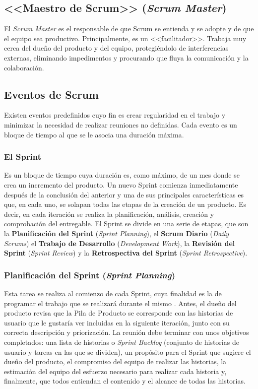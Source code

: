 \subsection*{<<Maestro de Scrum>> (\textit{Scrum Master})}
El \textit{Scrum Master} \cite{Gomez2017} es el responsable de que Scrum se entienda y se adopte y de que el equipo sea productivo. Principalmente, es un <<facilitador>>. Trabaja muy cerca del dueño del producto y del equipo, protegiéndolo de interferencias externas, eliminando impedimentos y procurando que fluya la comunicación y la colaboración.

\subsection{Eventos de Scrum}
Existen eventos \cite{Schwaber2017} predefinidos cuyo fin es crear regularidad en el trabajo y minimizar la necesidad de realizar reuniones no definidas. Cada evento es un bloque de tiempo al que se le asocia una duración máxima.

\newpage

\subsubsection{El Sprint}
Es un bloque de tiempo cuya duración es, como máximo, de un mes donde se crea un incremento del producto. Un nuevo Sprint comienza inmediatamente después de la conclusión del anterior y una de sus principales características es que, en cada uno, se solapan todas las etapas de la creación de un producto. Es decir, en cada iteración se realiza la planificación, análisis, creación y comprobación del entregable. El Sprint se divide en una serie de etapas, que son la \textbf{Planificación del Sprint} (\textit{Sprint Planning}), el \textbf{Scrum Diario} (\textit{Daily Scrums}) el \textbf{Trabajo de Desarrollo} (\textit{Development Work}), la \textbf{Revisión del Sprint} (\textit{Sprint Review}) y la \textbf{Retrospectiva del Sprint} (\textit{Sprint Retrospective}).

\subsubsection{Planificación del Sprint (\textit{Sprint Planning})}
Esta tarea se realiza al comienzo de cada Sprint, cuya finalidad es la de programar el trabajo que se realizará durante el mismo \cite{Gomez2017}. Antes, el dueño del producto revisa que la Pila de Producto se corresponde con las historias de usuario que le gustaría ver incluidas en la siguiente iteración, junto con su correcta descripción y priorización. La reunión debe terminar con unos objetivos completados: una lista de historias o \textit{Sprint Backlog} (conjunto de historias de usuario y tareas en las que se dividen), un propósito para el Sprint que sugiere el dueño del producto, el compromiso del equipo de realizar las historias, la estimación del equipo del esfuerzo necesario para realizar cada historia y, finalmente,  que todos entiendan el contenido y el alcance de todas las historias.

